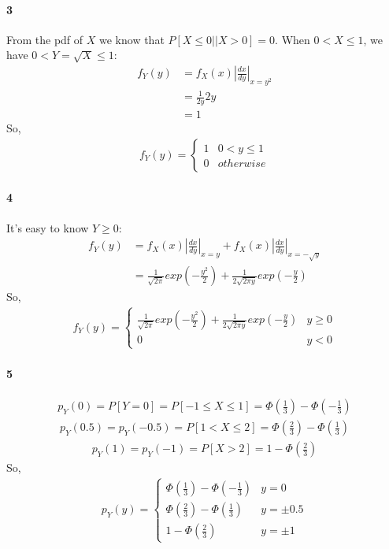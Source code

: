 \documentclass[22pt]{article}
\begin{document}
	\paragraph{3}From the pdf of $X$ we know that $P[X\leq 0||X>0] = 0$. When $0<X\leq 1$, we have $0< Y = \sqrt{X} \leq 1$:
	\begin{align}
	f_Y(y) & = f_X(x)|\frac{dx}{dy}|_{x = y^2}\\
	& = \frac{1}{2y}2y\\
	& = 1
	\end{align}
	So, \begin{align}
	f_Y(y) = 
				\begin{cases}
				1 & 0< y \leq 1\\
				0 & otherwise
				\end{cases}
	\end{align}

	\paragraph{4}It's easy to know $Y \geq 0$: 
	\begin{align}
	f_Y(y) & = f_X(x)|\frac{dx}{dy}|_{x = y} + f_X(x)|\frac{dx}{dy}|_{x = -\sqrt{y}}\\
	& = \frac{1}{\sqrt{2 \pi}}exp(-\frac{y^2}{2}) +  \frac{1}{2\sqrt{2 \pi y}}exp(-\frac{y}{2})
	\end{align}
	So,\begin{align}
	f_Y(y) = 
				\begin{cases}
				\frac{1}{\sqrt{2 \pi}}exp(-\frac{y^2}{2}) +  \frac{1}{2\sqrt{2 \pi y}}exp(-\frac{y}{2}) & y \geq 0\\
				0 & y<0
				\end{cases}
	\end{align}

	\paragraph{5}
	\begin{align} p_Y(0) = P[Y = 0] = P[-1 \leq X \leq 1] = \Phi(\frac{1}{3}) - \Phi(-\frac{1}{3})
	\end{align}
	\begin{align}
	p_Y(0.5) = p_Y(-0.5) = P[1<X \leq 2] = \Phi(\frac{2}{3}) - \Phi(\frac{1}{3})
	\end{align}
	\begin{align} p_Y(1) = p_Y(-1) = P[X>2] = 1 - \Phi(\frac{2}{3})
	\end{align}
	So,\begin{align}
	p_Y(y) = 
				\begin{cases}
				\Phi(\frac{1}{3}) - \Phi(-\frac{1}{3}) & y = 0\\
				\Phi(\frac{2}{3}) - \Phi(\frac{1}{3}) & y = \pm 0.5\\
				1 - \Phi(\frac{2}{3}) & y = \pm 1
				\end{cases}
	\end{align}
\end{document}
